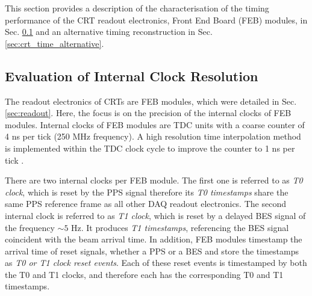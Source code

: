 
This section provides a description of the characterisation of the timing performance of the CRT readout electronics, Front End Board (FEB) modules, in Sec. \ref{sec:crt_time_precision} and an alternative timing reconstruction in Sec. \ref{sec:crt_time_alternative}.

\subsection{Evaluation of Internal Clock Resolution}
\label{sec:crt_time_precision}

The readout electronics of CRTs are FEB modules, which were detailed in Sec. \ref{sec:readout}.
Here, the focus is on the precision of the internal clocks of FEB modules. 
Internal clocks of FEB modules are TDC units with a coarse counter of 4 ns per tick (250 MHz frequency). 
A high resolution time interpolation method is implemented within the TDC clock cycle to improve the counter to 1 ns per tick \cite{crt_clock}.

There are two internal clocks per FEB module.
The first one is referred to as \textit{T0 clock}, which is reset by the PPS signal therefore its \textit{T0 timestamps} share the same PPS reference frame as all other DAQ readout electronics.
The second internal clock is referred to as \textit{T1 clock}, which is reset by a delayed BES signal of the frequency $\sim 5$ Hz. 
It produces \textit{T1 timestamps}, referencing the BES signal coincident with the beam arrival time.
In addition, FEB modules timestamp the arrival time of reset signals, whether a PPS or a BES and store the timestamps as \textit{T0 or T1 clock reset events}.
Each of these reset events is timestamped by both the T0 and T1 clocks, and therefore each has the corresponding T0 and T1 timestamps.


